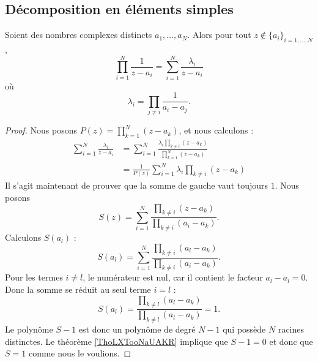 \subsection{Décomposition en éléments simples}
\label{SUBSECooSIYXooDDHUdD}

\begin{lemma}     \label{LEMooABJMooJTUpgV}
	Soient des nombres complexes distincts \( a_1,\ldots, a_N\). Alors pour tout \( z\notin\{ a_i \}_{i=1,\ldots, N}\),
	\begin{equation}
		\prod_{i=1}^N  \frac{1}{z-a_i }=\sum_{i=1}^N\frac{ \lambda_i }{ z-a_i }
	\end{equation}
	où
	\begin{equation}
		\lambda_i=\prod_{j\neq i}\frac{1}{ a_i-a_j }.
	\end{equation}
\end{lemma}

\begin{proof}
	Nous posons \( P(z)=\prod_{k=1}^N(z-a_k)\), et nous calculons :
	\begin{subequations}
		\begin{align}
			\sum_{i=1}^N\frac{ \lambda_i }{ z-a_i } & =  \sum_{i=1}^N\frac{ \lambda_i\prod_{k\neq i}(z-a_k) }{ \prod_{k=1}^N(z-a_k) } \\
			                                        & =  \frac{1}{ P(z) }\sum_{i=1}^N\lambda_i\prod_{k\neq i}(z-a_k)
		\end{align}
	\end{subequations}
	Il s'agit maintenant de prouver que la somme de gauche vaut toujours \( 1\). Nous posons
	\begin{equation}
		S(z)=\sum_{i=1}^N\frac{ \prod_{k\neq i}(z-a_k) }{ \prod_{k\neq i}(a_i-a_k) }.
	\end{equation}
	Calculons \( S(a_l)\) :
	\begin{equation}
		S(a_l)=\sum_{i=1}^N\frac{ \prod_{k\neq i}(a_l-a_k) }{ \prod_{k\neq i}(a_i-a_k) }.
	\end{equation}
	Pour les termes \( i\neq l\), le numérateur est nul, car il contient le facteur \( a_l-a_l=0\). Donc la somme se réduit au seul terme \( i=l\) :
	\begin{equation}
		S(a_l)=\frac{ \prod_{k\neq l}(a_l-a_k) }{ \prod_{k\neq l}(a_l-a_k) }=1.
	\end{equation}
	Le polynôme \( S-1\) est donc un polynôme de degré \( N-1\) qui possède \( N\) racines distinctes. Le théorème \ref{ThoLXTooNaUAKR} implique que \( S-1=0\) et donc que \( S=1\) comme nous le voulions.
\end{proof}


